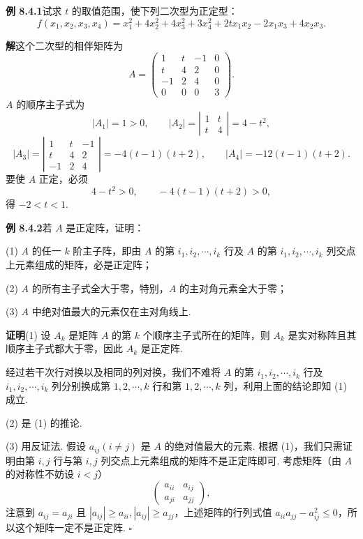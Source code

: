 \documentclass[UTF8, 12pt, fontset=fandol, oneside]{ctexart}
\begin{document}
\noindent\textbf{例 8.4.1}\quad 试求 $t$ 的取值范围，使下列二次型为正定型：
\[
f(x_1,x_2,x_3,x_4)=x_1^2+4x_2^2+4x_3^2+3x_4^2+2tx_1x_2-2x_1x_3+4x_2x_3.
\]

\noindent\textbf{解}\quad 这个二次型的相伴矩阵为
\[
A=\left(\begin{array}{rrrr}
1&t&-1&0\\
t&4&2&0\\
-1&2&4&0\\
0&0&0&3
\end{array}\right).
\]
$A$ 的顺序主子式为
\[
|A_1|=1>0,\qquad |A_2|=\left|\begin{array}{cc}1&t\\ t&4\end{array}\right|=4-t^2,
\]
\[
|A_3|=\left|\begin{array}{rrr}
1&t&-1\\
t&4&2\\
-1&2&4
\end{array}\right|=-4(t-1)(t+2),\qquad |A_4|=-12(t-1)(t+2).
\]
要使 $A$ 正定，必须
\[
4-t^2>0,\qquad -4(t-1)(t+2)>0,
\]
得 $-2<t<1$.

\noindent\textbf{例 8.4.2}\quad 若 $A$ 是正定阵，证明：

(1) $A$ 的任一 $k$ 阶主子阵，即由 $A$ 的第 $i_1,i_2,\cdots,i_k$ 行及 $A$ 的第 $i_1,i_2,\cdots,i_k$ 列交点上元素组成的矩阵，必是正定阵；

(2) $A$ 的所有主子式全大于零，特别，$A$ 的主对角元素全大于零；

(3) $A$ 中绝对值最大的元素仅在主对角线上.

\noindent\textbf{证明}\quad (1) 设 $A_k$ 是矩阵 $A$ 的第 $k$ 个顺序主子式所在的矩阵，则 $A_k$ 是实对称阵且其顺序主子式都大于零，因此 $A_k$ 是正定阵.

经过若干次行对换以及相同的列对换，我们不难将 $A$ 的第 $i_1,i_2,\cdots,i_k$ 行及 $i_1,i_2,\cdots,i_k$ 列分别换成第 $1,2,\cdots,k$ 行和第 $1,2,\cdots,k$ 列，利用上面的结论即知 (1) 成立.

(2) 是 (1) 的推论.

(3) 用反证法. 假设 $a_{ij}(i\ne j)$ 是 $A$ 的绝对值最大的元素. 根据 (1)，我们只需证明由第 $i,j$ 行与第 $i,j$ 列交点上元素组成的矩阵不是正定阵即可. 考虑矩阵（由 $A$ 的对称性不妨设 $i<j$）
\[
\left(\begin{array}{cc}a_{ii}&a_{ij}\\ a_{ji}&a_{jj}\end{array}\right),
\]
注意到 $a_{ij}=a_{ji}$ 且 $|a_{ij}|\geq a_{ii}, |a_{ij}|\geq a_{jj}$，上述矩阵的行列式值 $a_{ii}a_{jj}-a_{ij}^2\leq 0$，所以这个矩阵一定不是正定阵. $\square$
\end{document}
